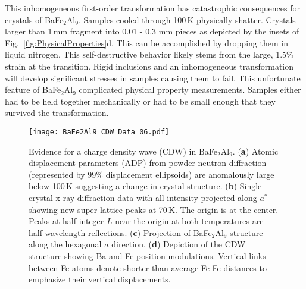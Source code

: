 \documentclass[journal=cmatex,manuscript=article]{achemso}
\begin{document}

\label{sec:Results_XtalShatter}
This inhomogeneous first-order transformation has catastrophic consequences for crystals of BaFe$_2$Al$_9$. Samples cooled through 100\,K physically shatter. Crystals larger than 1\,mm fragment into 0.01 - 0.3 mm pieces as depicted by the insets of Fig.~\ref{fig:PhysicalProperties}d. This can be accomplished by dropping them in liquid nitrogen. This self-destructive behavior likely stems from the large, 1.5\% strain at the transition. Rigid inclusions and an inhomogeneous transformation will develop significant stresses in samples causing them to fail. This unfortunate feature of BaFe$_2$Al$_9$ complicated physical property measurements. Samples either had to be held together mechanically or had to be small enough that they survived the transformation.

\begin{figure}
	\texttt{[image: BaFe2Al9\_CDW\_Data\_06.pdf]}
	\caption{\label{fig:CDW_data} 
		Evidence for a charge density wave (CDW) in BaFe$_2$Al$_9$. 
		(\textbf{a}) Atomic displacement parameters (ADP) from powder neutron diffraction (represented by 99\% displacement ellipsoids) are anomalously large below 100\,K suggesting a change in crystal structure.
		(\textbf{b}) Single crystal x-ray diffraction data with all intensity projected along $a^*$ showing new super-lattice peaks at 70\,K. The origin is at the center. Peaks at half-integer $L$ near the origin at both temperatures are half-wavelength reflections. 
		(\textbf{c}) Projection of BaFe$_2$Al$_9$ structure along the hexagonal $a$ direction. (\textbf{d}) Depiction of the CDW structure showing Ba and Fe position modulations. Vertical links between Fe atoms denote shorter than average Fe-Fe distances to emphasize their vertical displacements.
	}
\end{figure}
\end{document}
